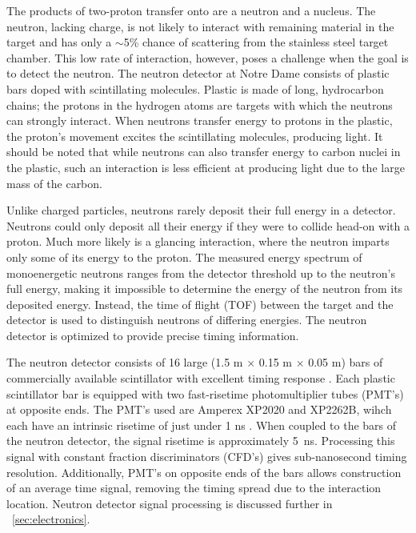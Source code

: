 The products of two-proton transfer onto \GeTargets are a neutron and a \SeProducts nucleus.  The neutron, lacking charge, is not likely to interact with remaining material in the target and has only a $\sim$5\% chance of scattering from the stainless steel target chamber.  This low rate of interaction, however, poses a challenge when the goal is to detect the neutron.  The neutron detector at Notre Dame consists of plastic bars doped with scintillating molecules.  Plastic is made of long, hydrocarbon chains; the protons in the hydrogen atoms are targets with which the neutrons can strongly interact.  When neutrons transfer energy to protons in the plastic, the proton's movement excites the scintillating molecules, producing light.  It should be noted that while neutrons can also transfer energy to carbon nuclei in the plastic, such an interaction is less efficient at producing light due to the large mass of the carbon.  

Unlike charged particles, neutrons rarely deposit their full energy in a detector.  Neutrons could only deposit all their energy if they were to collide head-on with a proton.  Much more likely is a glancing interaction, where the neutron imparts only some of its energy to the proton.  The measured energy spectrum of monoenergetic neutrons ranges from the detector threshold up to the neutron's full energy, making it impossible to determine the energy of the neutron from its deposited energy.  Instead, the time of flight (TOF) between the target and the detector is used to distinguish neutrons of differing energies.  The neutron detector is optimized to provide precise timing information.       

The neutron detector \citep{KolataNeutwall} consists of 16 large (1.5 m $\times$ 0.15 m $\times$ 0.05 m) bars of commercially available scintillator with excellent timing response \citep{BC408}.  Each plastic scintillator bar is equipped with two fast-risetime photomultiplier tubes (PMT's) at opposite ends.  The PMT's used are Amperex XP2020 and XP2262B, wihch each have an intrinsic risetime of just under 1 ns \citep{PMT_XP2020,KolataNeutwall}.   When coupled to the bars of the neutron detector, the signal risetime is approximately 5~ns.  Processing this signal with constant fraction discriminators (CFD's) gives sub-nanosecond timing resolution.  Additionally, PMT's on opposite ends of the bars allows construction of an average time signal, removing the timing spread due to the interaction location.  Neutron detector signal processing is discussed further in {\sect}~\ref{sec:electronics}.

